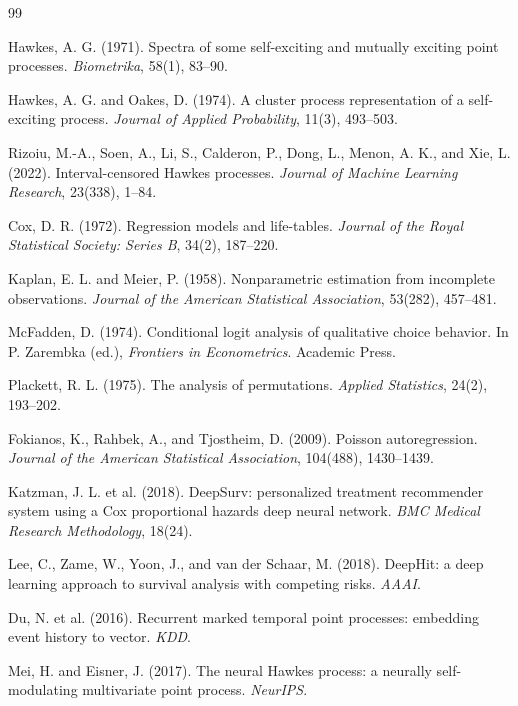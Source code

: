 \documentclass[11pt]{article}
\theoremstyle{plain}
\theoremstyle{definition}
\theoremstyle{remark}
\begin{document}
\begin{thebibliography}{99}

 Hawkes, A. G. (1971). Spectra of some self-exciting and mutually exciting point processes. \emph{Biometrika}, 58(1), 83--90.

 Hawkes, A. G. and Oakes, D. (1974). A cluster process representation of a self-exciting process. \emph{Journal of Applied Probability}, 11(3), 493--503.

 Rizoiu, M.-A., Soen, A., Li, S., Calderon, P., Dong, L., Menon, A. K., and Xie, L. (2022). Interval-censored Hawkes processes. \emph{Journal of Machine Learning Research}, 23(338), 1--84.

 Cox, D. R. (1972). Regression models and life-tables. \emph{Journal of the Royal Statistical Society: Series B}, 34(2), 187--220.

 Kaplan, E. L. and Meier, P. (1958). Nonparametric estimation from incomplete observations. \emph{Journal of the American Statistical Association}, 53(282), 457--481.

 McFadden, D. (1974). Conditional logit analysis of qualitative choice behavior. In P. Zarembka (ed.), \emph{Frontiers in Econometrics}. Academic Press.

 Plackett, R. L. (1975). The analysis of permutations. \emph{Applied Statistics}, 24(2), 193--202.

 Fokianos, K., Rahbek, A., and Tjostheim, D. (2009). Poisson autoregression. \emph{Journal of the American Statistical Association}, 104(488), 1430--1439.

 Katzman, J. L. et al. (2018). DeepSurv: personalized treatment recommender system using a Cox proportional hazards deep neural network. \emph{BMC Medical Research Methodology}, 18(24).

 Lee, C., Zame, W., Yoon, J., and van der Schaar, M. (2018). DeepHit: a deep learning approach to survival analysis with competing risks. \emph{AAAI}.

 Du, N. et al. (2016). Recurrent marked temporal point processes: embedding event history to vector. \emph{KDD}.

 Mei, H. and Eisner, J. (2017). The neural Hawkes process: a neurally self-modulating multivariate point process. \emph{NeurIPS}.


\end{thebibliography}
\end{document}
